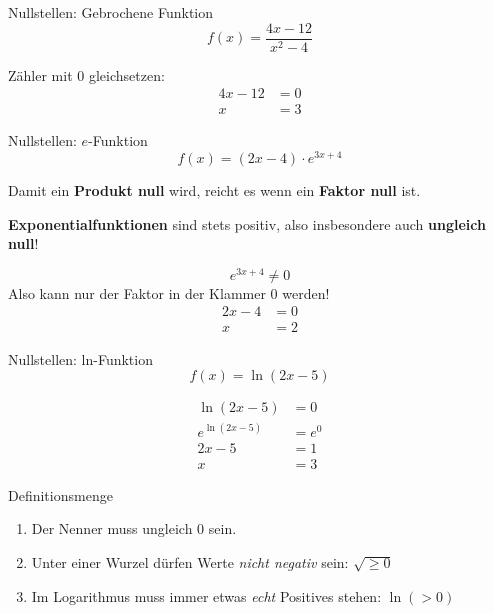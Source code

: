 \documentclass[paper=a6,ngerman,twoside=true,fontsize=14pt, parskip = half]{scrartcl}
\begin{document}
\begin{frage}
	Nullstellen: Gebrochene Funktion
	\[
	f(x)=\frac{4x-12}{x^2-4}
	\]
\end{frage}
\begin{antwort}
	Zähler mit 0 gleichsetzen:
	\begin{align*}
	4x-12&=0 \\
	x&=3
	\end{align*}
\end{antwort}
\begin{frage}
	Nullstellen: $e$-Funktion
	\[
	f(x)=(2x-4)\cdot{e^{3x+4}}
	\]
\end{frage}
\begin{antwort}
	\begin{marked}
		Damit ein \textbf{Produkt null} wird, reicht es wenn ein 
		\textbf{Faktor null} ist.
	\end{marked}

	\begin{marked}
		\textbf{Exponentialfunktionen} sind stets positiv, 
		also insbesondere auch \textbf{ungleich null}!
	\end{marked}
	\[
	{e^{3x+4}}\neq0
	\]
	Also kann nur der Faktor in der Klammer 0 werden!
	\begin{align*}
	2x-4&=0 \\
	x&=2
	\end{align*}
\end{antwort}
\begin{frage}
	Nullstellen: ln-Funktion
	\[
	f(x)=\ln(2x-5)
	\]
\end{frage}
\begin{antwort}
	\begin{align*}
		\ln(2x-5)&=0\\
		{e^{\ln(2x-5)}}&=e^0\\
		2x-5&=1\\
		x&=3
	\end{align*}

\end{antwort}
\begin{frage}
	Definitionsmenge
\end{frage}
\begin{antwort}
	\begin{enumerate}
		\item Der Nenner muss ungleich 0 sein.
		\item Unter einer Wurzel dürfen Werte \emph{nicht negativ} sein: $\sqrt{\ge 0}$
		\item Im Logarithmus muss immer etwas \emph{echt} Positives stehen: $\ln(>0)$
	\end{enumerate}
\end{antwort}
\end{document}
